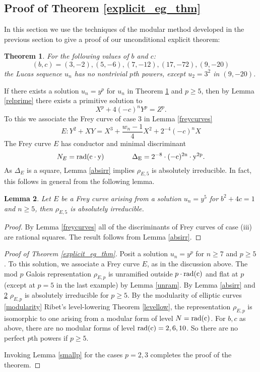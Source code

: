 \documentclass[12pt]{amsart}
\newtheorem{thm}{Theorem}[section]
\newtheorem{lem}[thm]{Lemma}
\theoremstyle{definition}
\newcommand{\rad}{\rm rad}
\begin{document}
\subsection{Proof of Theorem \ref{explicit_eg_thm}}

In this section we use the techniques of the modular method developed in the previous section to give a proof of our unconditional explicit theorem:

\begin{thm}\label{explicit_eg_thm_inplace}
For the following values of $b$ and $c$:
\begin{equation}\label{examples} (b,c) = (3,-2), (5,-6), (7,-12), (17,-72), (9,-20) \end{equation}
the Lucas sequence $u_n$ has no nontrivial $p$th powers, except $u_2 = 3^2$ in $(9,-20)$.
\end{thm}


If there exists a solution $u_n = y^p$ for $u_n$ in Theorem \ref{explicit_eg_thm_inplace} and $p \geq 5$, then by Lemma \ref{relprime} there exists a primitive solution to 
\[ X^p + 4(-c)^n Y^p = Z^p. \]
To this we associate the Frey curve of case 3 in Lemma \ref{freycurves}
\[E: Y^2 + XY = X^3 + \frac{w_n - 1}{4} X^2 + 2^{-4}(-c)^nX \]
The Frey curve $E$ has conductor and minimal discriminant
\[ N_E =\rad(c \cdot y)  \qquad \qquad \Delta_E = 2^{-8} \cdot (-c)^{2n} \cdot y^{2p}. \]
As $\Delta_E$ is a square, Lemma \ref{absirr} implies $\rho_{E,5}$ is absolutely irreducible.  In fact, this follows in general from the following lemma.

\begin{lem}\label{frey5irr}
Let $E$ be a Frey curve arising from a solution $u_n = y^5$ for $b^2+4c = 1$ and $n\geq 5$, then $\rho_{E,5}$ is absolutely irreducible.
\end{lem}
\begin{proof}
By Lemma \ref{freycurves} all of the discriminants of Frey curves of case (iii) are rational squares.  The result follows from Lemma \ref{absirr}.
\end{proof}

\begin{proof}[Proof of Theorem \ref{explicit_eg_thm}]
Posit a solution $u_n = y^p$ for $n \geq 7$ and $p \geq 5$.  To this solution, we associate a Frey curve $E$, as in the discussion above.  The mod $p$ Galois representation $\rho_{E,p}$ is unramified outside $p\cdot \rad{(c)}$ and flat at $p$ (except at $p=5$ in the last example) by Lemma \ref{unram}.   By Lemma \ref{absirr} and \ref{frey5irr} $\rho_{E,p}$ is absolutely irreducible for $p\geq 5$.  By the modularity of elliptic curves \ref{modularity} Ribet's level-lowering Theorem \ref{levellow}, the representation $\rho_{E,p}$ is isomorphic to one arising from a modular form of level $N = \rad(c)$.  For $b,c$ as above, there are no modular forms of level $\rad(c)=2,6,10$.  So there are no perfect $p$th powers if $p \geq 5$.

Invoking Lemma \ref{smallp} for the cases $p=2,3$ completes the proof of the theorem.
\end{proof}
\end{document}

